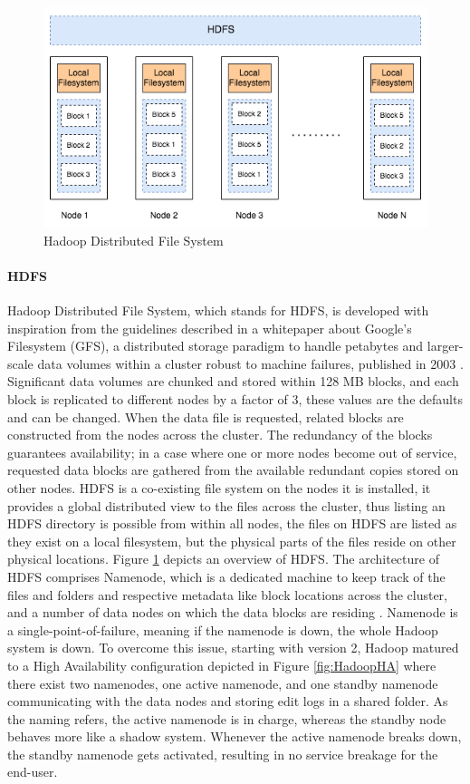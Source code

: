 \documentclass[review]{elsarticle}
\begin{document}
\begin{figure}[h!]
	\caption{Hadoop Distributed File System}
	\label{fig:HDFSoverview}
	\includegraphics[width=\textwidth]{HDFSoverview}
	\centering
\end{figure}

\paragraph{HDFS}Hadoop Distributed File System, which stands for HDFS, is developed with inspiration from the guidelines described in a whitepaper about Google's Filesystem (GFS), a distributed storage paradigm to handle petabytes and larger-scale data volumes within a cluster robust to machine failures, published in 2003 \cite{ghemawat_google_2003}. Significant data volumes are chunked and stored within 128 MB blocks, and each block is replicated to different nodes by a factor of 3, these values are the defaults and can be changed. When the data file is requested, related blocks are constructed from the nodes across the cluster. The redundancy of the blocks guarantees availability; in a case where one or more nodes become out of service, requested data blocks are gathered from the available redundant copies stored on other nodes. HDFS is a co-existing file system on the nodes it is installed, it provides a global distributed view to the files across the cluster, thus listing an HDFS directory is possible from within all nodes, the files on HDFS are listed as they exist on a local filesystem, but the physical parts of the files reside on other physical locations. Figure \ref{fig:HDFSoverview} depicts an overview of HDFS. The architecture of HDFS comprises Namenode, which is a dedicated machine to keep track of the files and folders and respective metadata like block locations across the cluster, and a number of data nodes on which the data blocks are residing \cite{white_hadoop_2015}. Namenode is a single-point-of-failure, meaning if the namenode is down, the whole Hadoop system is down. To overcome this issue, starting with version 2, Hadoop matured to a High Availability configuration depicted in Figure \ref{fig:HadoopHA} where there exist two namenodes, one active namenode, and one standby namenode communicating with the data nodes and storing edit logs in a shared folder. As the naming refers, the active namenode is in charge, whereas the standby node behaves more like a shadow system. Whenever the active namenode breaks down, the standby namenode gets activated, resulting in no service breakage for the end-user.
\end{document}
